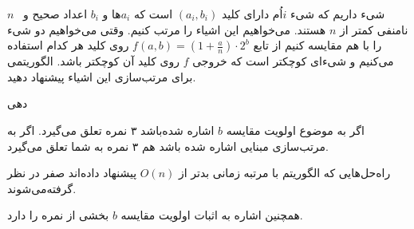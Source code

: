 $n$ 
شیء داریم که شیء $i$اُم دارای کلید $(a_i, b_i)$ است که $a_i$ها و $b_i$ اعداد صحیح و نامنفی کمتر از $n$ هستند. می‌خواهیم این اشیاء را مرتب کنیم. وقتی می‌خواهیم دو شیء را با هم مقایسه کنیم از تابع $f(a, b) = (1+\frac{a}{n})\cdot 2^b$ روی کلید هر کدام استفاده می‌کنیم و شیء‌ای کوچکتر است که خروجی $f$ روی کلید آن کوچکتر باشد. الگوریتمی برای مرتب‌سازی این اشیاء پیشنهاد دهید.



‌دهی{
	اگر به موضوع اولویت مقایسه
	$b$
	اشاره شده‌باشد ۳ نمره تعلق می‌گیرد.
	اگر به مرتب‌سازی مبنایی اشاره شده باشد هم ۳ نمره به شما تعلق می‌گیرد.
	
	راه‌حل‌هایی که الگوریتم با مرتبه زمانی بدتر از 
	$O(n)$
	پیشنهاد داده‌اند صفر در نظر گرفته‌می‌شوند.
	
	همچنین اشاره به اثبات اولویت مقایسه 
	$b$
	بخشی از نمره را دارد.
	
}



